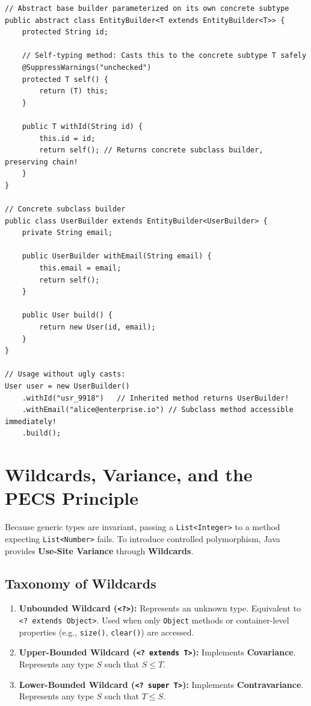\documentclass[10pt,journal,compsoc,onecolumn]{IEEEtran}
\begin{document}
\begin{lstlisting}[caption={CRTP Self-Typed Hierarchical Builder Architecture}, label={lst:crtp_builder}]
// Abstract base builder parameterized on its own concrete subtype
public abstract class EntityBuilder<T extends EntityBuilder<T>> {
    protected String id;

    // Self-typing method: Casts this to the concrete subtype T safely
    @SuppressWarnings("unchecked")
    protected T self() {
        return (T) this;
    }

    public T withId(String id) {
        this.id = id;
        return self(); // Returns concrete subclass builder, preserving chain!
    }
}

// Concrete subclass builder
public class UserBuilder extends EntityBuilder<UserBuilder> {
    private String email;

    public UserBuilder withEmail(String email) {
        this.email = email;
        return self();
    }

    public User build() {
        return new User(id, email);
    }
}

// Usage without ugly casts:
User user = new UserBuilder()
    .withId("usr_9918")   // Inherited method returns UserBuilder!
    .withEmail("alice@enterprise.io") // Subclass method accessible immediately!
    .build();
\end{lstlisting}

\section{Wildcards, Variance, and the PECS Principle}
\label{sec:wildcards}

Because generic types are invariant, passing a \texttt{List<Integer>} to a method expecting \texttt{List<Number>} fails. To introduce controlled polymorphism, Java provides \textbf{Use-Site Variance} through \textbf{Wildcards}.

\subsection{Taxonomy of Wildcards}
\begin{enumerate}
    \item \textbf{Unbounded Wildcard (\texttt{<?>}):} Represents an unknown type. Equivalent to \texttt{<? extends Object>}. Used when only \texttt{Object} methods or container-level properties (e.g., \texttt{size()}, \texttt{clear()}) are accessed.
    \item \textbf{Upper-Bounded Wildcard (\texttt{<? extends T>}):} Implements \textbf{Covariance}. Represents any type $S$ such that $S \le T$.
    \item \textbf{Lower-Bounded Wildcard (\texttt{<? super T>}):} Implements \textbf{Contravariance}. Represents any type $S$ such that $T \le S$.
\end{enumerate}
\end{document}
